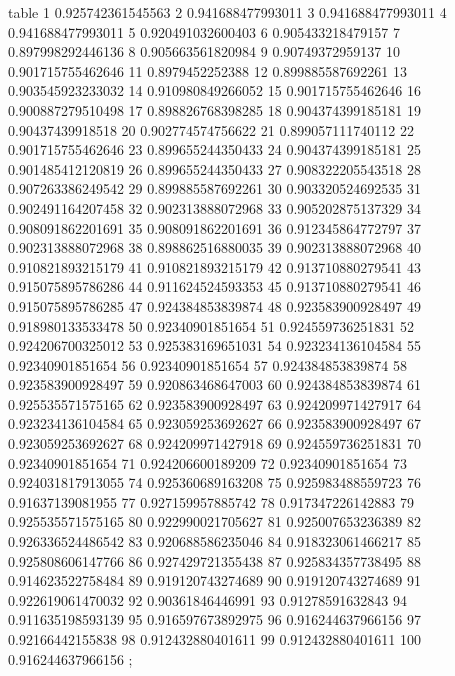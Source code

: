 table {%
	1 0.925742361545563
	2 0.941688477993011
	3 0.941688477993011
	4 0.941688477993011
	5 0.920491032600403
	6 0.905433218479157
	7 0.897998292446136
	8 0.905663561820984
	9 0.90749372959137
	10 0.901715755462646
	11 0.8979452252388
	12 0.899885587692261
	13 0.903545923233032
	14 0.910980849266052
	15 0.901715755462646
	16 0.900887279510498
	17 0.898826768398285
	18 0.904374399185181
	19 0.90437439918518
	20 0.902774574756622
	21 0.899057111740112
	22 0.901715755462646
	23 0.899655244350433
	24 0.904374399185181
	25 0.901485412120819
	26 0.899655244350433
	27 0.908322205543518
	28 0.907263386249542
	29 0.899885587692261
	30 0.903320524692535
	31 0.902491164207458
	32 0.902313888072968
	33 0.905202875137329
	34 0.908091862201691
	35 0.908091862201691
	36 0.912345864772797
	37 0.902313888072968
	38 0.898862516880035
	39 0.902313888072968
	40 0.910821893215179
	41 0.910821893215179
	42 0.913710880279541
	43 0.915075895786286
	44 0.911624524593353
	45 0.913710880279541
	46 0.915075895786285
	47 0.924384853839874
	48 0.923583900928497
	49 0.918980133533478
	50 0.92340901851654
	51 0.924559736251831
	52 0.924206700325012
	53 0.925383169651031
	54 0.923234136104584
	55 0.92340901851654
	56 0.92340901851654
	57 0.924384853839874
	58 0.923583900928497
	59 0.920863468647003
	60 0.924384853839874
	61 0.925535571575165
	62 0.923583900928497
	63 0.924209971427917
	64 0.923234136104584
	65 0.923059253692627
	66 0.923583900928497
	67 0.923059253692627
	68 0.924209971427918
	69 0.924559736251831
	70 0.92340901851654
	71 0.924206600189209
	72 0.92340901851654
	73 0.924031817913055
	74 0.925360689163208
	75 0.925983488559723
	76 0.91637139081955
	77 0.927159957885742
	78 0.917347226142883
	79 0.925535571575165
	80 0.922990021705627
	81 0.925007653236389
	82 0.926336524486542
	83 0.920688586235046
	84 0.918323061466217
	85 0.925808606147766
	86 0.927429721355438
	87 0.925834357738495
	88 0.914623522758484
	89 0.919120743274689
	90 0.919120743274689
	91 0.922619061470032
	92 0.90361846446991
	93 0.91278591632843
	94 0.911635198593139
	95 0.916597673892975
	96 0.916244637966156
	97 0.92166442155838
	98 0.912432880401611
	99 0.912432880401611
	100 0.916244637966156
};
